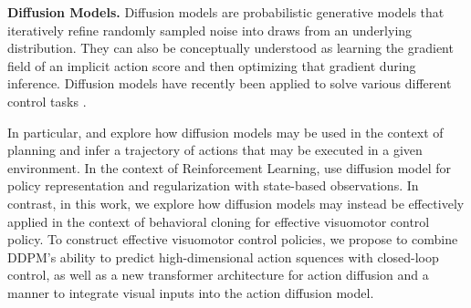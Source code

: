 


\textbf{Diffusion Models.}
Diffusion models are probabilistic generative models that iteratively refine randomly sampled noise into draws from an underlying distribution. They can also be conceptually understood as learning the gradient field of an implicit action score and then optimizing that gradient during inference.
Diffusion models \citep{sohldickstein2015nonequilibrium, ho2020denoising} have recently been applied to solve various different control tasks \citep{janner2022diffuser, urain2022se, ajay2022conditional}.

In particular, \citet{janner2022diffuser} and \citet{huang2023diffusion} explore how diffusion models may be  used in the context of planning and infer a trajectory of actions that may be executed in a given environment. 
In the context of Reinforcement Learning, \citet{wang2022diffusion} use diffusion model for policy representation and regularization with state-based observations.
In contrast, in this work, we explore how diffusion models may instead be effectively applied in the context of behavioral cloning for effective visuomotor control policy. 
To construct effective visuomotor control policies, we propose to combine DDPM's ability to predict high-dimensional action squences with closed-loop control, as well as a new transformer architecture for action diffusion and a manner to integrate visual inputs into the action diffusion model.

